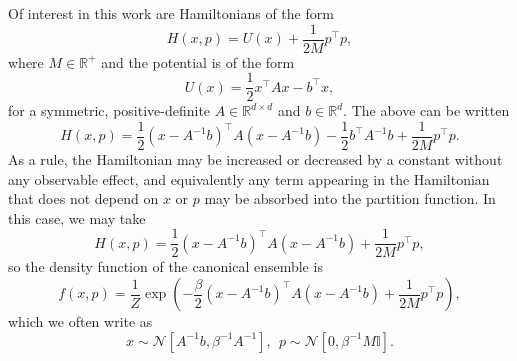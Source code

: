 \documentclass[prx,onecolumn,floatfix,longbibliography,notitlepage, nofootinbib]{revtex4-1}
\begin{document}
\begin{appendix}
Of interest in this work are Hamiltonians of the form
\begin{equation}
    H(x,p) = U(x) + \frac{1}{2M} p^\intercal p,
\end{equation}
where $M\in \mathbb{R}^+$ and the potential is of the form
\begin{equation}
\label{eq:full-potential}
U(x) = \frac{1}{2} x^\intercal A x - b^\intercal x,
\end{equation}
for a symmetric, positive-definite $A\in \mathbb{R}^{d\times d}$ and $b\in \mathbb{R}^d$. The above can be written
\begin{equation}
\label{eq:full-hamiltonian}
    H(x,p) = \frac{1}{2}(x - A^{-1}b)^\intercal A(x - A^{-1} b) - \frac{1}{2}b^\intercal A^{-1} b + \frac{1}{2M}p^\intercal p.
\end{equation}
As a rule, the Hamiltonian may be increased or decreased by a constant without any observable effect, and equivalently any term appearing in the Hamiltonian that does not depend on $x$ or $p$ may be absorbed into the partition function. In this case, we may take
\begin{equation}
\label{eq:full-hamiltonian-shifted}
   H(x,p) = \frac{1}{2}(x - A^{-1} b)^\intercal A(x - A^{-1} b)+\frac{1}{2M}p^\intercal p,
\end{equation}
so the density function of the canonical ensemble is
\begin{equation}
f(x,p) = \frac{1}{Z}\exp \left( -\frac{\beta}{2}(x - A^{-1} b)^\intercal A(x - A^{-1} b) + \frac{1}{2M} p^\intercal p \right),
\end{equation}
which we often write as
\begin{equation}
\label{eq:full-hamiltonian-gibbs-dist}
    x \sim \mathcal{N}[A^{-1}b, \beta^{-1}A^{-1}], \: \: p \sim  \mathcal{N}\left[0, \beta^{-1} M \mathbb{I}\right].
\end{equation}




\end{appendix}
\end{document}
